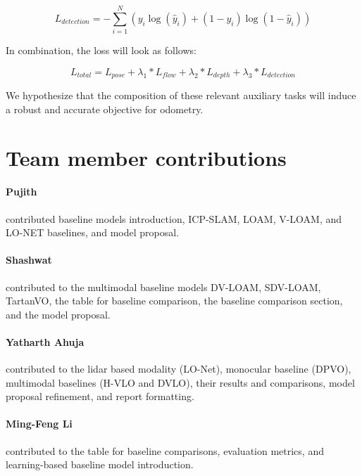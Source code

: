 \documentclass[11pt,a4paper]{article}
\begin{document}
\begin{equation}
L_{detection} = - \sum_{i=1}^{N} \left( y_i \log(\hat{y}_i) + (1 - y_i) \log(1 - \hat{y}_i) \right)
\end{equation}

In combination, the loss will look as follows:

\begin{equation}
    L_{total} = L_{pose} + \lambda_1*L_{flow} + \lambda_2*L_{depth} + \lambda_3*L_{detection}
\end{equation}

We hypothesize that the composition of these relevant auxiliary tasks will induce a robust and accurate objective for odometry.



\section{Team member contributions}
\paragraph{Pujith} contributed baseline models introduction, ICP-SLAM, LOAM, V-LOAM, and LO-NET baselines, and model proposal.

\paragraph{Shashwat} contributed to the multimodal baseline models DV-LOAM, SDV-LOAM, TartanVO, the table for baseline comparison, the baseline comparison section, and the model proposal.

\paragraph{Yatharth Ahuja} contributed to the lidar based modality (LO-Net), monocular baseline (DPVO), multimodal baselines (H-VLO and DVLO), their results and comparisons, model proposal refinement, and report formatting. 

\paragraph{Ming-Feng Li} contributed to the table for baseline comparisons, evaluation metrics, and learning-based baseline model introduction.





\end{document}
